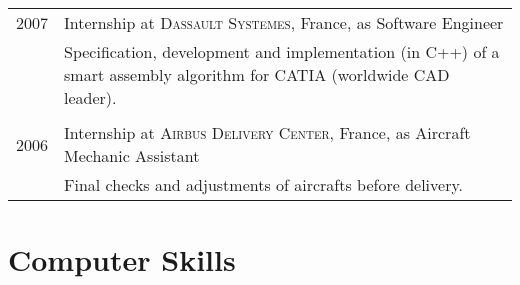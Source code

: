 \documentclass[a4paper,10pt]{article} %
\begin{document}
\begin{tabular}{r|p{11cm}}

\textsc{2007} & Internship at \textsc{Dassault
  Systemes}, France, as Software Engineer \\
& \footnotesize{Specification, development and implementation (in C++) of a
  smart assembly algorithm for CATIA (worldwide CAD leader).} \\
\multicolumn{2}{c}{} \\


\textsc{2006} & Internship at \textsc{Airbus Delivery Center}, France,
 as Aircraft Mechanic Assistant \\
& \footnotesize{Final checks and adjustments of aircrafts before delivery.} \\




\end{tabular}


\section{Computer Skills}
\end{document}

